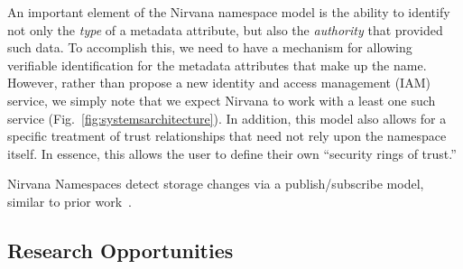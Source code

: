 
An important element of the Nirvana namespace model is the ability to identify not only the \textit{type} of a metadata attribute,
but also the \textit{authority} that provided such data.
To accomplish this, we need to have a mechanism for allowing verifiable identification for the metadata attributes that make up the name.
However, rather than propose a new identity and access management (IAM) service,
we simply note that we expect Nirvana to work with a least one such service (Fig.~\ref{fig:systemsarchitecture}).
In addition, this model also allows for a specific treatment of trust relationships that need not rely upon the namespace itself.
In essence, this allows the user to define their own ``security rings of trust.''

Nirvana Namespaces detect storage changes via a publish/subscribe model, similar to prior work~\cite{birman1987exploiting,9229638}.

\subsection{Research Opportunities}\label{hotos21:research}



